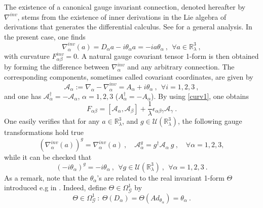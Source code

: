 \documentclass[a4paper,11pt,twoside]{article}
\numberwithin{equation}{section}
\theoremstyle{nonumberplain}
\newcounter{and}
\begin{document}
%
The existence of a canonical gauge invariant connection, denoted hereafter by $\nabla^{inv}$, stems from the existence of inner derivations in the Lie algebra of derivations that generates the differential calculus. See \cite{mdv88-99} for a general analysis. In the present case, one finds
%
\begin{equation} 
\nabla^{inv}_\alpha(a) = D_\alpha a - i \theta_\alpha a = - i a \theta_\alpha \ , \ \ \forall a \in \mathbb{R}^3_\lambda \ , \label{invar-connect}
\end{equation}
%
with curvature $F^{inv}_{\alpha\beta}=0$. A natural gauge covariant tensor 1-form is then obtained by forming the difference between $\nabla^{inv}_\alpha$ and any arbitrary connection. The corresponding components, sometimes called covariant coordinates, are given by%
%
\begin{equation}
\mathcal{A}_\alpha := \nabla_\alpha - \nabla^{inv}_\alpha = A_\alpha + i \theta_\alpha \ , \ \ \forall i=1,2,3 \ , \label{tens-form}
\end{equation}
%
and one has $\mathcal{A}_\alpha^\dag = - \mathcal{A}_\alpha$, $\alpha=1,2,3$ ($A_\alpha^\dag=-A_\alpha$). By using \eqref{curv1}, one obtains%
%
\begin{equation} 
F_{\alpha\beta} = \left[\mathcal{A}_\alpha,\mathcal{A}_\beta\right] + \frac{1}{\lambda} \epsilon_{\alpha\beta\gamma} \mathcal{A}_\gamma \ . \label{curv2}
\end{equation}
%
One easily verifies that for any $a\in\mathbb{R}^3_\lambda$, and $g\in\mathcal{U}(\mathbb{R}^3_\lambda)$, the following gauge transformations hold true%
%
\begin{equation*}
(\nabla^{inv}_\alpha(a))^g = \nabla^{inv}_\alpha(a) \ , \quad \mathcal{A}^g_\alpha = g^\dag \mathcal{A}_\alpha \ g \ , \quad \forall \alpha=1,2,3,
\end{equation*}
%
while it can be checked that%
%
\begin{equation} 
(-i\theta_\alpha)^g = - i \theta_\alpha \ , \ \ \forall g \in \mathcal{U}(\mathbb{R}^3_\lambda) \ , \ \ \forall \alpha = 1,2,3 \ . \label{conection-invariace}
\end{equation}
%
As a remark, note that the $\theta_\alpha$'s are related to the real invariant 1-form $\Theta$ introduced e.g in \cite{mdv88-99}. Indeed, define $\Theta\in\Omega^1_\mathcal{G}$ by%
%
\begin{equation*}
\Theta \in \Omega^1_\mathcal{G} \ : \ \Theta(D_\alpha) = \Theta(Ad_{\theta_\alpha}) = \theta_\alpha \ .
\end{equation*}
\end{document}
